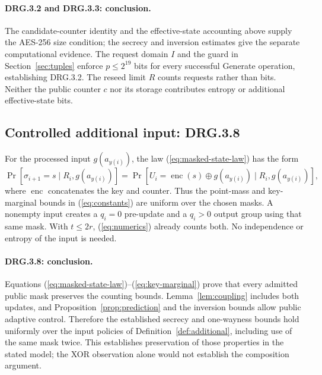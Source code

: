 \documentclass[journal=tosc,preprint,floatrow,nohyperxmp]{iacrtrans}
\newif\ifjordireview
\newcounter{jordinote}
\newcommand{\jordinote}[2]{%
  \ifjordireview
  \stepcounter{jordinote}\par\medskip\noindent
  \fcolorbox{blue!55!black}{blue!4}{%
    \begin{minipage}{\dimexpr\linewidth-2\fboxsep-2\fboxrule\relax}
    \small\raggedright\color{blue!45!black}
    \textbf{Solo Jordi -- J\thejordinote: #1}\par\smallskip
    #2
    \end{minipage}}\par\medskip
  \fi
}
\numberwithin{lemma}{section}
\numberwithin{proposition}{section}
\numberwithin{equation}{section}
\theoremstyle{definition}
\numberwithin{definition}{section}
\theoremstyle{plain}
\begin{document}
\jordinote{Por qué descartamos AES-128 y AES-192}{Aquí seguimos el criterio de estado efectivo del propio AIS: fijada una clave candidata, el primer bloque conocido determina el contador candidato. Revisa ese paso y las referencias AIS 102 y 1007. El conteo limita el espacio de búsqueda; por sí solo no demuestra dificultad computacional para AES-256. Esa parte necesita los argumentos posteriores.}

\paragraph{DRG.3.2 and DRG.3.3: conclusion.}
The candidate-counter identity and the effective-state accounting above supply the AES-256 size condition; the secrecy and inversion estimates give the separate computational evidence. The request domain $I$ and the guard in Section~\ref{sec:tuples} enforce $p\le2^{19}$ bits for every successful Generate operation, establishing DRG.3.2. The reseed limit $R$ counts requests rather than bits. Neither the public counter $c$ nor its storage contributes entropy or additional effective-state bits.

\subsection{Controlled additional input: DRG.3.8}
For the processed input $g(a_{y(i)})$, the law (\ref{eq:masked-state-law}) has the form
\[
 \Pr[\sigma_{i+1}=s\mid R_i,g(a_{y(i)})]
 =\Pr[U_i=\operatorname{enc}(s)\oplus g(a_{y(i)})\mid R_i,g(a_{y(i)})],
\]
where $\operatorname{enc}$ concatenates the key and counter. Thus the point-mass and key-marginal bounds in (\ref{eq:constants}) are uniform over the chosen masks. A nonempty input creates a $q_i=0$ pre-update and a $q_i>0$ output group using that same mask. With $t\le2r$, (\ref{eq:numerics}) already counts both. No independence or entropy of the input is needed.

\paragraph{DRG.3.8: conclusion.}
Equations (\ref{eq:masked-state-law})--(\ref{eq:key-marginal}) prove that every admitted public mask preserves the counting bounds. Lemma~\ref{lem:coupling} includes both updates, and Proposition~\ref{prop:prediction} and the inversion bounds allow public adaptive control. Therefore the established secrecy and one-wayness bounds hold uniformly over the input policies of Definition~\ref{def:additional}, including use of the same mask twice. This establishes preservation of those properties in the stated model; the XOR observation alone would not establish the composition argument.
\end{document}
